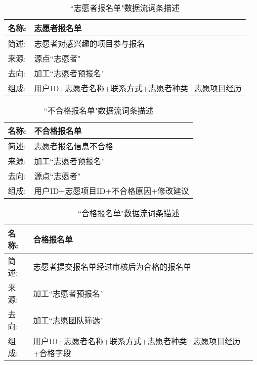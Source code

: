 \begin{table}[H]  
    \caption{``志愿者报名单"数据流词条描述}  
    \begin{center}  
        \begin{tabular}{l p{11cm}} 
            \hline
            \quad 名称: & 志愿者报名单 \\
            \hline
            \quad 简述: & 志愿者对感兴趣的项目参与报名 \\
            \hline
            \quad 来源: & 源点``志愿者" \\
            \hline
            \quad 去向: & 加工``志愿者预报名" \\
            \hline
            \quad 组成: & 用户ID+志愿者名称+联系方式+志愿者种类+{志愿项目经历}  \\
            \hline
        \end{tabular}
        \label{tab1}
    \end{center}
    \end{table}


 \begin{table}[H]  
    \caption{``不合格报名单"数据流词条描述}  
    \begin{center}  
        \begin{tabular}{l p{11cm}} 
            \hline
            \quad 名称: & 不合格报名单 \\
            \hline
            \quad 简述: & 志愿者报名信息不合格 \\
            \hline
            \quad 来源: & 加工``志愿者预报名" \\
            \hline
            \quad 去向: & 源点``志愿者" \\
            \hline
            \quad 组成: & 用户ID+志愿项目ID+{不合格原因+修改建议}  \\
            \hline
        \end{tabular}
        \label{tab1}
    \end{center}
    \end{table}


\begin{table}[H]  
    \caption{``合格报名单"数据流词条描述}  
    \begin{center}  
        \begin{tabular}{l p{11cm}} 
            \hline
            \quad 名称: & 合格报名单 \\
            \hline
            \quad 简述: & 志愿者提交报名单经过审核后为合格的报名单 \\
            \hline
            \quad 来源: & 加工``志愿者预报名" \\
            \hline
            \quad 去向: & 加工``志愿团队筛选" \\
            \hline
            \quad 组成: & 用户ID+志愿者名称+联系方式+志愿者种类+{志愿项目经历}+合格字段  \\
            \hline
        \end{tabular}
        \label{tab1}
    \end{center}
    \end{table}


